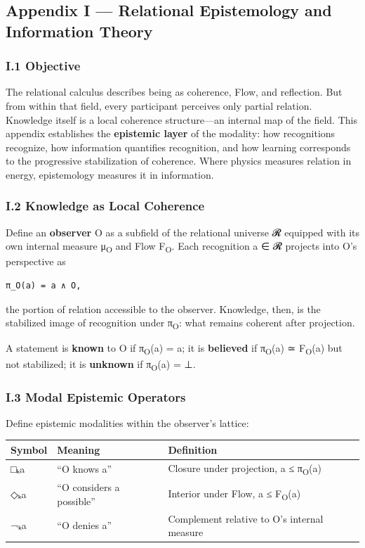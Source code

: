 \documentclass[11pt]{article}
\begin{document}
\subsection*{Appendix I — Relational Epistemology and Information Theory}
\label{sec:orgb5b11e9}

\subsubsection*{I.1 Objective}
\label{sec:orgd542983}
The relational calculus describes being as coherence, Flow, and reflection.  
But from within that field, every participant perceives only partial relation.  
Knowledge itself is a local coherence structure—an internal map of the field.  
This appendix establishes the \textbf{epistemic layer} of the modality:  
how recognitions recognize, how information quantifies recognition,  
and how learning corresponds to the progressive stabilization of coherence.  
Where physics measures relation in energy, epistemology measures it in information.
\subsubsection*{I.2 Knowledge as Local Coherence}
\label{sec:org07390fc}
Define an \textbf{observer} O as a subfield of the relational universe 𝓡  
equipped with its own internal measure μ\textsubscript{O} and Flow F\textsubscript{O}.  
Each recognition a ∈ 𝓡 projects into O’s perspective as  

\begin{verbatim}
π_O(a) = a ∧ O,
\end{verbatim}

the portion of relation accessible to the observer.  
Knowledge, then, is the stabilized image of recognition under π\textsubscript{O}:  
what remains coherent after projection.

A statement is \textbf{known} to O if π\textsubscript{O}(a) = a;  
it is \textbf{believed} if π\textsubscript{O}(a) ≃ F\textsubscript{O}(a) but not stabilized;  
it is \textbf{unknown} if π\textsubscript{O}(a) = ⊥.
\subsubsection*{I.3 Modal Epistemic Operators}
\label{sec:org45528dc}
Define epistemic modalities within the observer’s lattice:

\begin{center}
\begin{tabular}{lll}
Symbol & Meaning & Definition\\
\hline
□ₖa & “O knows a” & Closure under projection, a ≤ π\textsubscript{O}(a)\\
◇ₖa & “O considers a possible” & Interior under Flow, a ≤ F\textsubscript{O}(a)\\
¬ₖa & “O denies a” & Complement relative to O’s internal measure\\
\end{tabular}
\end{center}
\end{document}
